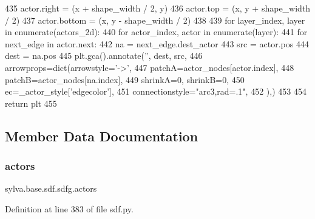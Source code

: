 \begin{DoxyCode}
435                     actor.right = (x + shape\_width / 2, y)
436                     actor.top = (x, y + shape\_width / 2)
437                     actor.bottom = (x, y - shape\_width / 2)
438 
439             \textcolor{keywordflow}{for} layer\_index, layer \textcolor{keywordflow}{in} enumerate(actors\_2d):
440                 \textcolor{keywordflow}{for} actor\_index, actor \textcolor{keywordflow}{in} enumerate(layer):
441                     \textcolor{keywordflow}{for} next\_edge \textcolor{keywordflow}{in} actor.next:
442                         na = next\_edge.dest\_actor
443                         src = actor.pos
444                         dest = na.pos
445                         plt.gca().annotate(\textcolor{stringliteral}{''}, dest, src,
446                                            arrowprops=dict(arrowstyle=\textcolor{stringliteral}{'->'},
447                                                            patchA=actor\_nodes[actor.index],
448                                                            patchB=actor\_nodes[na.index],
449                                                            shrinkA=0, shrinkB=0,
450                                                            ec=\_actor\_style[\textcolor{stringliteral}{'edgecolor'}],
451                                                            connectionstyle=\textcolor{stringliteral}{"arc3,rad=.1"},
452                                                            ),)
453 
454             \textcolor{keywordflow}{return} plt
455 \end{DoxyCode}


\subsection{Member Data Documentation}
\mbox{\label{classsylva_1_1base_1_1sdf_1_1sdfg_af732b01ce693d1d4b9fc0ebd99c3fdad}} 
\subsubsection{\texorpdfstring{actors}{actors}}
{\footnotesize\ttfamily sylva.\+base.\+sdf.\+sdfg.\+actors}



Definition at line 383 of file sdf.\+py.



